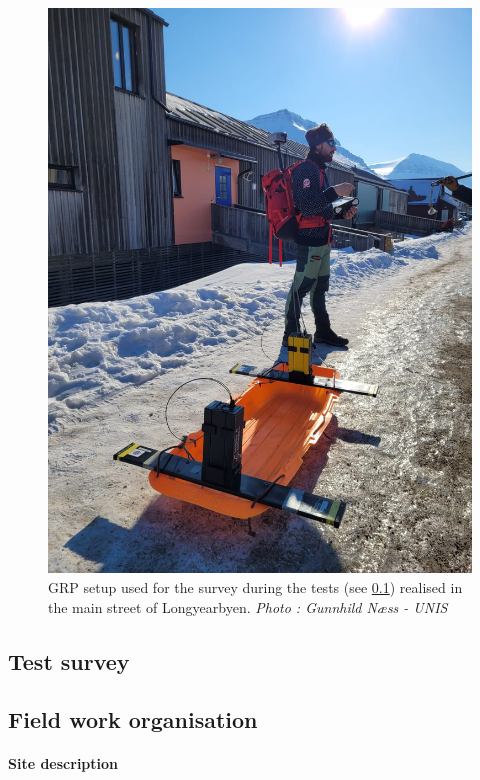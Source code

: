 \begin{figure}
    \centering
    \includegraphics[width=1.0\linewidth]{Images/00_Methodology/PictureGunnhild.jpg}
    \caption{GRP setup used for the survey during the tests (see \ref{Subsection:TestSurvey}) realised in the main street of Longyearbyen. \emph{Photo : Gunnhild Næss - UNIS}}
    \label{fig:PictureGunnhild}
\end{figure}

\subsection{Test survey} \label{Subsection:TestSurvey}

\subsection{Field work organisation}


\paragraph{Site description} \label{Paragraph:SiteDescription}

